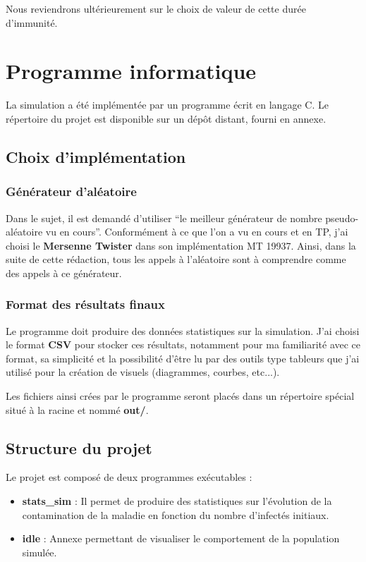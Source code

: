 \documentclass[12pt,french,titlepage]{article}
\begin{document}
Nous reviendrons ultérieurement sur le choix de valeur de cette durée d'immunité.

\newpage



\section{Programme informatique}
La simulation a été implémentée par un programme écrit en langage C. Le répertoire du projet est disponible sur un dépôt distant, fourni en annexe.


\subsection{Choix d'implémentation}
\subsubsection{Générateur d'aléatoire}
Dans le sujet, il est demandé d'utiliser “le meilleur générateur de nombre pseudo-aléatoire vu en cours”. Conformément à ce que l'on a vu en cours et en TP, j'ai choisi le \textbf{Mersenne Twister} dans son implémentation MT 19937. Ainsi, dans la suite de cette rédaction, tous les appels à l'aléatoire sont à comprendre comme des appels à ce générateur.

\subsubsection{Format des résultats finaux}
Le programme doit produire des données statistiques sur la simulation. J'ai choisi le format \textbf{CSV} pour stocker ces résultats, notamment pour ma familiarité avec ce format, sa simplicité et la possibilité d'être lu par des outils type tableurs que j'ai utilisé pour la création de visuels (diagrammes, courbes, etc...).

Les fichiers ainsi crées par le programme seront placés dans un répertoire spécial situé à la racine et nommé \textbf{out/}.


\subsection{Structure du projet}


Le projet est composé de deux programmes exécutables :

\begin{itemize}
\item \textbf{stats\_sim} : Il permet de produire des statistiques sur l'évolution de la contamination de la maladie en fonction du nombre d'infectés initiaux.
\item \textbf{idle} : Annexe permettant de visualiser le comportement de la population simulée.\\
\end{itemize}
\end{document}
